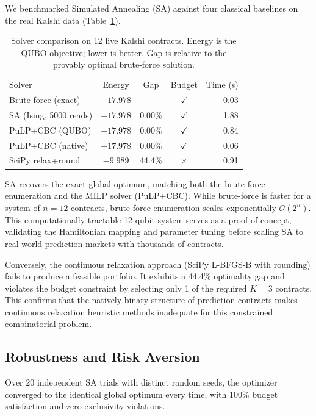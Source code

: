 \documentclass[aps, reprint, prl, twocolumn, superscriptaddress,amsmath,amssymb,noeprint]{revtex4-2}
\begin{document}
We benchmarked Simulated Annealing (SA) against four classical baselines on the real Kalshi data (Table~\ref{tab:benchmark}).

\begin{table}[H]
\caption{\label{tab:benchmark}Solver comparison on 12 live Kalshi contracts.
Energy is the QUBO objective; lower is better.  Gap is relative to the
provably optimal brute-force solution.}
\begin{ruledtabular}
\begin{tabular}{lcccr}
Solver & Energy & Gap & Budget & Time (s) \\
\colrule
Brute-force (exact)   & $-17.978$ & ---      & $\checkmark$ & 0.03 \\
SA (Ising, 5000 reads) & $-17.978$ & 0.00\%  & $\checkmark$ & 1.88 \\
PuLP+CBC (QUBO)       & $-17.978$ & 0.00\%   & $\checkmark$ & 0.84 \\
PuLP+CBC (native)     & $-17.978$ & 0.00\%   & $\checkmark$ & 0.06 \\
SciPy relax+round     & $-9.989$  & 44.4\%   & $\times$      & 0.91 \\
\end{tabular}
\end{ruledtabular}
\end{table}

SA recovers the exact global optimum, matching both the brute-force enumeration and the MILP solver (PuLP+CBC). While brute-force is faster for a system of $n=12$ contracts, brute-force enumeration scales exponentially $\mathcal{O}(2^n)$. This computationally tractable 12-qubit system serves as a proof of concept, validating the Hamiltonian mapping and parameter tuning before scaling SA to real-world prediction markets with thousands of contracts.

Conversely, the continuous relaxation approach (SciPy L-BFGS-B with rounding) fails to produce a feasible portfolio. It exhibits a 44.4\% optimality gap and violates the budget constraint by selecting only 1 of the required $K=3$ contracts. This confirms that the natively binary structure of prediction contracts makes continuous relaxation heuristic methods inadequate for this constrained combinatorial problem.

\subsection{Robustness and Risk Aversion}

Over 20 independent SA trials with distinct random seeds, the optimizer converged to the identical global optimum every time, with 100\% budget satisfaction and zero exclusivity violations. 
\end{document}
